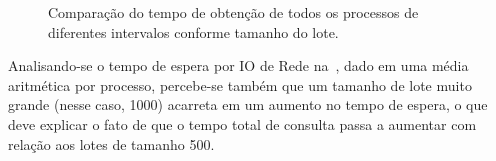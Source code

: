 \begin{figure}[htb]
    \centering
    \caption{%
        Comparação do tempo de obtenção de todos os processos de diferentes
        intervalos conforme tamanho do lote.
    }
    \label{gra:tempos-tamanhos-de-passo-async}
\end{figure}

Analisando-se o tempo de espera por IO de Rede
na~, dado em uma média
aritmética por processo, percebe-se também que um tamanho de lote muito grande
(nesse caso, 1000) acarreta em um aumento no tempo de espera, o que deve
explicar o fato de que o tempo total de consulta passa a aumentar com relação
aos lotes de tamanho 500.

